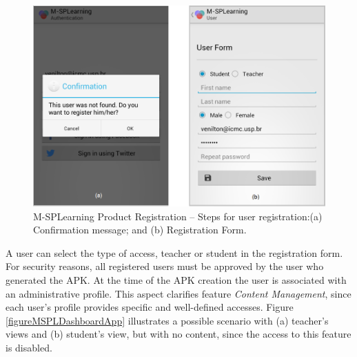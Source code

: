 \begin{figure}
\centering
\includegraphics[scale=0.33]{figures/section3/MSPLRegister}
\caption{M-SPLear\allowbreak ning Product Registration -- Steps for user registration:\newline(a) Confirmation message; and (b) Registration Form.}
\label{figureMSPLRegister}
\vspace{0.65cm}
\end{figure}

A user can select the type of access, teacher or student in the registration form. For security reasons, all registered users must be approved by the user who generated the APK. At the time of the APK creation the user is associated with an administrative profile. This aspect clarifies feature \textit{Content Management}, since each user's profile provides specific and well-defined accesses. Figure \ref{figureMSPLDashboardApp} illustrates a possible scenario with (a) teacher's views and (b) student's view, but with no content, since the access to this feature is disabled.

